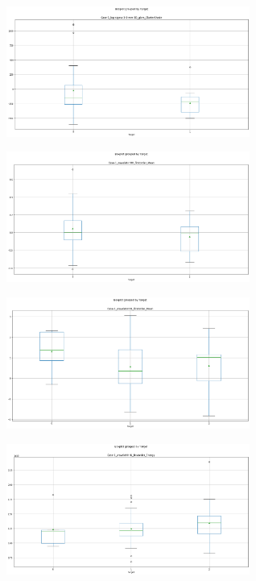 \documentclass[10pt,journal,compsoc]{IEEEtran}
\begin{document}
\begin{figure}
\begin{subfigure}{}
  \centering
  \includegraphics[width=8cm]{bg1.png}
  \caption{}
  \label{fig:sfig1}
\end{subfigure}%
\begin{subfigure}{}
  \centering
  \includegraphics[width=8cm]{bg2.png}
  \caption{}
  \label{fig:sfig2}
\end{subfigure}
\begin{subfigure}{}
  \centering
  \includegraphics[width=8cm]{tg1.png}
  \caption{}
  \label{fig:sfig3}
\end{subfigure}%
\begin{subfigure}{}
  \centering
  \includegraphics[width=8cm]{tg2.png}
  \caption{}
  \label{fig:sfig4}
\end{subfigure}
\end{figure}
\end{document}
